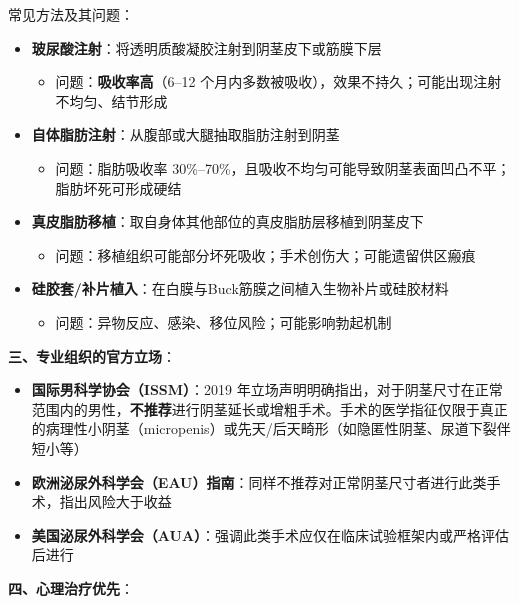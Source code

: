 \documentclass[12pt,a4paper,twoside]{ctexbook}
\begin{document}
常见方法及其问题：
\begin{itemize}[leftmargin=2cm]
	\item \textbf{玻尿酸注射}：将透明质酸凝胶注射到阴茎皮下或筋膜下层
	\begin{itemize}
		\item 问题：\textbf{吸收率高}（6--12 个月内多数被吸收），效果不持久；可能出现注射不均匀、结节形成
	\end{itemize}
	\item \textbf{自体脂肪注射}：从腹部或大腿抽取脂肪注射到阴茎
	\begin{itemize}
		\item 问题：脂肪吸收率 30\%--70\%，且吸收不均匀可能导致阴茎表面凹凸不平；脂肪坏死可形成硬结
	\end{itemize}
	\item \textbf{真皮脂肪移植}：取自身体其他部位的真皮脂肪层移植到阴茎皮下
	\begin{itemize}
		\item 问题：移植组织可能部分坏死吸收；手术创伤大；可能遗留供区瘢痕
	\end{itemize}
	\item \textbf{硅胶套/补片植入}：在白膜与Buck筋膜之间植入生物补片或硅胶材料
	\begin{itemize}
		\item 问题：异物反应、感染、移位风险；可能影响勃起机制
	\end{itemize}
\end{itemize}

\vspace{0.5em}
\noindent\textbf{三、专业组织的官方立场}：

\begin{itemize}[leftmargin=2cm]
	\item \textbf{国际男科学协会（ISSM）}：2019 年立场声明明确指出，对于阴茎尺寸在正常范围内的男性，\textbf{不推荐}进行阴茎延长或增粗手术。手术的医学指征仅限于真正的病理性小阴茎（micropenis）或先天/后天畸形（如隐匿性阴茎、尿道下裂伴短小等）
	\item \textbf{欧洲泌尿外科学会（EAU）指南}：同样不推荐对正常阴茎尺寸者进行此类手术，指出风险大于收益
	\item \textbf{美国泌尿外科学会（AUA）}：强调此类手术应仅在临床试验框架内或严格评估后进行
\end{itemize}

\vspace{0.5em}
\noindent\textbf{四、心理治疗优先}：
\end{document}
